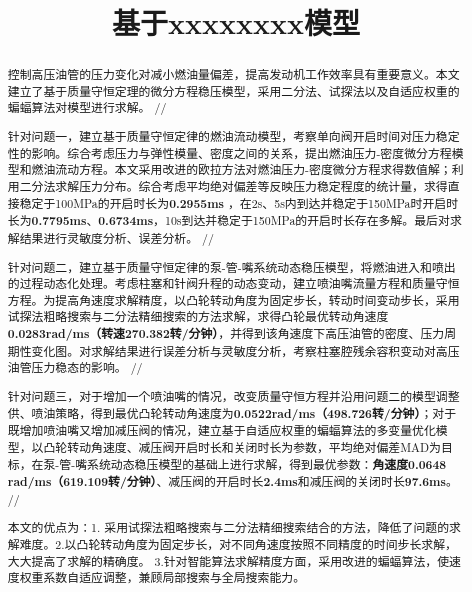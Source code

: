 \documentclass{whutmod}
\title{基于xxxxxxxx模型}
\begin{document}
	\maketitle
	\thispagestyle{empty}
	\begin{abstract}
		控制高压油管的压力变化对减小燃油量偏差，提高发动机工作效率具有重要意义。本文建立了基于质量守恒定理的微分方程稳压模型，采用二分法、试探法以及自适应权重的蝙蝠算法对模型进行求解。
		//
	
		针对问题一，建立基于质量守恒定律的燃油流动模型，考察单向阀开启时间对压力稳定性的影响。综合考虑压力与弹性模量、密度之间的关系，提出燃油压力-密度微分方程模型和燃油流动方程。本文采用改进的欧拉方法对燃油压力-密度微分方程求得数值解；利用二分法求解压力分布。综合考虑平均绝对偏差等反映压力稳定程度的统计量，求得直接稳定于100MPa的开启时长为\textbf{0.2955ms} ，在2s、5s内到达并稳定于150MPa时开启时长为\textbf{0.7795ms}、\textbf{0.6734ms}，10s到达并稳定于150MPa的开启时长存在多解。最后对求解结果进行灵敏度分析、误差分析。
		//
	
		针对问题二，建立基于质量守恒定律的泵-管-嘴系统动态稳压模型，将燃油进入和喷出的过程动态化处理。考虑柱塞和针阀升程的动态变动，建立喷油嘴流量方程和质量守恒方程。为提高角速度求解精度，以凸轮转动角度为固定步长，转动时间变动步长，采用试探法粗略搜索与二分法精细搜索的方法求解，求得凸轮最优转动角速度\textbf{0.0283rad/ms（转速270.382转/分钟）}，并得到该角速度下高压油管的密度、压力周期性变化图。对求解结果进行误差分析与灵敏度分析，考察柱塞腔残余容积变动对高压油管压力稳态的影响。
		//
	
		针对问题三，对于增加一个喷油嘴的情况，改变质量守恒方程并沿用问题二的模型调整供、喷油策略，得到最优凸轮转动角速度为\textbf{0.0522rad/ms（498.726转/分钟）}；对于既增加喷油嘴又增加减压阀的情况，建立基于自适应权重的蝙蝠算法的多变量优化模型，以凸轮转动角速度、减压阀开启时长和关闭时长为参数，平均绝对偏差MAD为目标，在泵-管-嘴系统动态稳压模型的基础上进行求解，得到最优参数：\textbf{角速度0.0648 rad/ms（619.109转/分钟）}、减压阀的开启时长\textbf{2.4ms}和减压阀的关闭时长\textbf{97.6ms}。
		//
	
		本文的优点为：1. 采用试探法粗略搜索与二分法精细搜索结合的方法，降低了问题的求解难度。2.以凸轮转动角度为固定步长，对不同角速度按照不同精度的时间步长求解，大大提高了求解的精确度。 3.针对智能算法求解精度方面，采用改进的蝙蝠算法，使速度权重系数自适应调整，兼顾局部搜索与全局搜索能力。
		
	\end{abstract}
\end{document}

